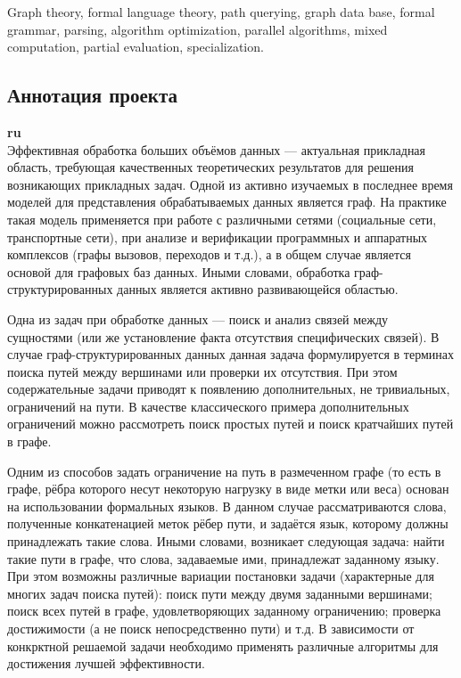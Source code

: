 \documentclass[12pt]{article}  %
\theoremstyle{remark}
\begin{document}
Graph theory, formal language theory, path querying, graph data base, formal grammar, parsing, algorithm optimization, parallel algorithms, mixed computation, partial evaluation, specialization.



\subsection{Аннотация проекта}
\textbf{ru}\\
%
Эффективная обработка больших объёмов данных --- актуальная прикладная область, требующая качественных теоретических результатов для решения возникающих прикладных задач.
Одной из активно изучаемых в последнее время моделей для представления обрабатываемых данных является граф.
На практике такая модель применяется при работе с различными сетями (социальные сети, транспортные сети), при анализе и верификации программных и аппаратных комплексов (графы вызовов, переходов и т.д.), а в общем случае является основой для графовых баз данных.
Иными словами, обработка граф-структурированных данных является активно развивающейся областью.

Одна из задач при обработке данных --- поиск и анализ связей между сущностями (или же установление факта отсутствия специфических связей).
В случае граф-структурированных данных данная задача формулируется в терминах поиска путей между вершинами или проверки их отсутствия.
При этом содержательные задачи приводят к появлению дополнительных, не тривиальных, ограничений на пути.
В качестве классического примера дополнительных ограничений можно рассмотреть поиск простых путей и поиск кратчайших путей в графе.

Одним из способов задать ограничение на путь в размеченном графе (то есть в графе, рёбра которого несут некоторую нагрузку в виде метки или веса) основан на использовании формальных языков.
В данном случае рассматриваются слова, полученные конкатенацией меток рёбер пути, и задаётся язык, которому должны принадлежать такие слова.
Иными словами, возникает следующая задача: найти такие пути в графе, что слова, задаваемые ими, принадлежат заданному языку.
При этом возможны различные вариации постановки задачи (характерные для многих задач поиска путей): поиск пути между двумя заданными вершинами; поиск всех путей в графе, удовлетворяющих заданному ограничению; проверка достижимости (а не поиск непосредственно пути) и т.д.
В зависимости от конкрктной решаемой задачи необходимо применять различные алгоритмы для достижения лучшей эффективности.
\end{document}
